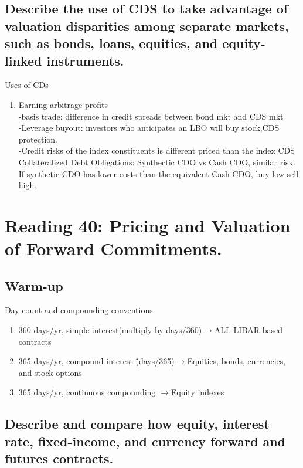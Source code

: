 \documentclass{article}
\newcommand{\be}{\begin{enumerate}}
\newcommand{\ee}{\end{enumerate}}
\newcommand{\ra}{$\rightarrow$}
\begin{document}
\subsection{Describe the use of CDS to take advantage of valuation disparities
among separate markets, such as bonds, loans, equities, and equity-linked instruments.}
Uses of CDs
\be
    \item Earning arbitrage profits
        \\-basis trade: difference in credit spreads between bond mkt and CDS mkt
        \\-Leverage buyout: investors who anticipates an LBO will buy stock,CDS protection.
        \\-Credit risks of the index constituents is different priced than the index CDS
        \\Collateralized Debt Obligations: Synthectic CDO vs Cash CDO, similar risk. If synthetic CDO
        has lower costs than the equivalent Cash CDO, buy low sell high.
\ee

\section{Reading 40: Pricing and Valuation of Forward Commitments.}
\subsection*{Warm-up}
Day count and compounding conventions
\be
    \item 360 days/yr, simple interest(multiply by days/360)\ra ALL LIBAR based contracts
    \item 365 days/yr, compound interest \^(days/365)\ra Equities, bonds, currencies, and stock options
    \item 365 days/yr, continuous compounding \ra Equity indexes
\ee
\subsection{Describe and compare how equity, interest rate, fixed-income, and
currency forward and futures contracts.}
\end{document}
